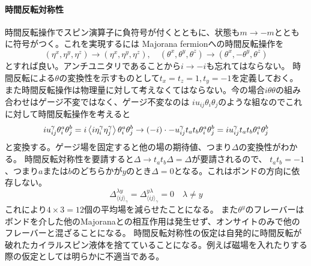 \documentclass[11pt, aps, longbibliography]{article}
\begin{document}
        \paragraph{時間反転対称性}
        時間反転操作でスピン演算子に負符号が付くとともに、状態も$m\rightarrow -m$とともに符号がつく。これを実現するには
        Majorana fermionへの時間反転操作を
        \begin{equation}\label{eq:SO6Majorana-12}
            (\eta^x, \eta^y, \eta^z) \rightarrow (\eta^x, \eta^y, \eta^z), \quad (\theta^x, \theta^y, \theta^z) \rightarrow (\theta^x, -\theta^y, \theta^z)
        \end{equation}
        とすれば良い。アンチユニタリであることから$i\rightarrow -i$も忘れてはならない。
        時間反転による$\theta$の変換性を示すものとして$t_x=t_z=1, t_y=-1$を定義しておく。
        また時間反転操作は物理量に対して考えなくてはならない。今の場合$i\theta \theta$の組み合わせはゲージ不変ではなく、ゲージ不変なのは
        $iu_{ij}\theta_i\theta_j$のような組なのでこれに対して時間反転操作を考えると
        \begin{equation}\label{eq:SO6Majorana-13}
            iu_{ij}^{\gamma}\theta_i^a\theta_j^b = i\expval{i\eta_i^\gamma\eta_j^\gamma}\theta_i^a\theta_j^b \rightarrow (-i) \cdot -u_{ij}^\gamma t_at_b\theta_i^a\theta_j^b = iu_{ij}^\gamma t_at_b\theta_i^a\theta_j^b
        \end{equation}
        と変換する。ゲージ場を固定すると他の場の期待値、つまり$\Delta$の変換性がわかる。
        時間反転対称性を要請すると$\Delta \rightarrow t_at_b\Delta = \Delta$が要請されるので、
        $t_at_b=-1$、つまり$a$または$b$のどちらかが$y$のとき$\Delta = 0$となる。これはボンドの方向に依存しない。
        \begin{equation}\label{eq:SO6Majorana-14}
            \Delta_{\langle ij \rangle_\gamma}^{\lambda y} = \Delta_{\langle ij \rangle_\gamma}^{y\lambda} = 0 \quad \lambda \neq y
        \end{equation}
        これにより$4\times3=12$個の平均場を減らせたことになる。
        また$\theta^y$のフレーバーはボンドを介した他のMajoranaとの相互作用は発生せず、オンサイトのみで他のフレーバーと混ざることになる。
        時間反転対称性の仮定は自発的に時間反転が破れたカイラルスピン液体を捨てていることになる。例えば磁場を入れたりする際の仮定としては明らかに不適当である。
\end{document}
